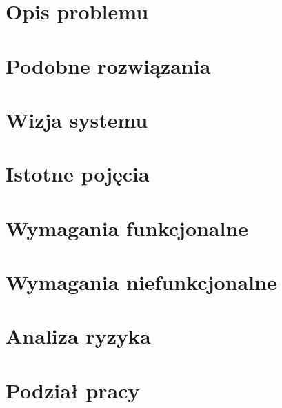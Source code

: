 \documentclass[../praca-dyplomowa.tex]{subfiles}
\begin{document}
\section{Opis problemu}


\section{Podobne rozwiązania}


\section{Wizja systemu}


\section{Istotne pojęcia}


\section{Wymagania funkcjonalne}


\section{Wymagania niefunkcjonalne}


\section{Analiza ryzyka}


\section{Podział pracy}

\end{document}
